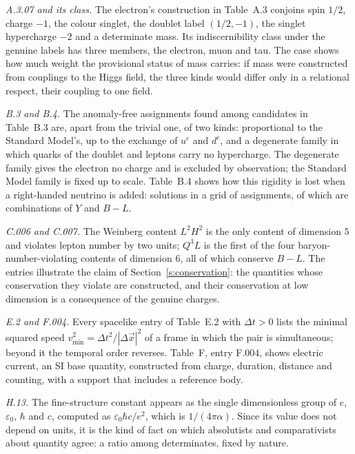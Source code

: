 \documentclass{situationist-preprint}
\begin{document}
\emph{A.3.07 and its class.} The electron's construction in Table~A.3 conjoins spin $1/2$, charge $-1$, the colour singlet, the doublet label $(1/2,-1)$, the singlet hypercharge $-2$ and a determinate mass. Its indiscernibility class under the genuine labels has three members, the electron, muon and tau. The case shows how much weight the provisional status of mass carries: if mass were constructed from couplings to the Higgs field, the three kinds would differ only in a relational respect, their coupling to one field.

\emph{B.3 and B.4.} The \vvNBthree{} anomaly-free assignments found among \vvNBthreeSpace{} candidates in Table~B.3 are, apart from the trivial one, of two kinds: \vvNBthreeSM{} proportional to the Standard Model's, up to the exchange of $u^c$ and $d^c$, and a degenerate family in which quarks of the doublet and leptons carry no hypercharge. The degenerate family gives the electron no charge and is excluded by observation; the Standard Model family is fixed up to scale. Table~B.4 shows how this rigidity is lost when a right-handed neutrino is added: \vvNBfour{} solutions in a grid of \vvNBfourSpace{} assignments, of which \vvNBfourLin{} are combinations of $Y$ and $B-L$.

\emph{C.006 and C.007.} The Weinberg content $L^2 H^2$ is the only content of dimension $5$ and violates lepton number by two units; $Q^3 L$ is the first of the four baryon-number-violating contents of dimension $6$, all of which conserve $B-L$. The entries illustrate the claim of Section~\ref{s:conservation}: the quantities whose conservation they violate are constructed, and their conservation at low dimension is a consequence of the genuine charges.

\emph{E.2 and F.004.} Every spacelike entry of Table~E.2 with $\Delta t > 0$ lists the minimal squared speed $v^2_{\min} = \Delta t^2/|\Delta \vec x|^2$ of a frame in which the pair is simultaneous; beyond it the temporal order reverses. Table~F, entry F.004, shows electric current, an SI base quantity, constructed from charge, duration, distance and counting, with a support that includes a reference body.

\emph{H.13.} The fine-structure constant appears as the single dimensionless group of $e$, $\varepsilon_0$, $\hbar$ and $c$, computed as $\varepsilon_0\hbar c/e^2$, which is $1/(4\pi\alpha)$. Since its value does not depend on units, it is the kind of fact on which absolutists and comparativists about quantity agree: a ratio among determinates, fixed by nature.
\end{document}
